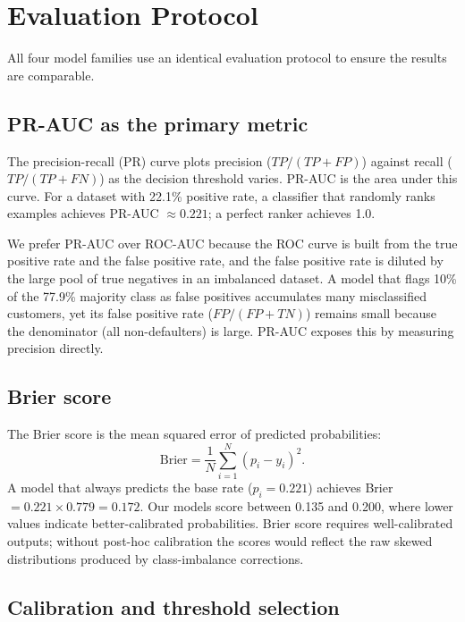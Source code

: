\documentclass[12pt,a4paper]{article}
\begin{document}
\section{Evaluation Protocol}
\label{sec:eval}

All four model families use an identical evaluation protocol to ensure the
results are comparable.

\subsection{PR-AUC as the primary metric}

The precision-recall (PR) curve plots precision
($TP / (TP + FP)$) against recall ($TP / (TP + FN)$) as the decision
threshold varies. PR-AUC is the area under this curve. For a dataset with
22.1\% positive rate, a classifier that randomly ranks examples achieves
PR-AUC $\approx 0.221$; a perfect ranker achieves 1.0.

We prefer PR-AUC over ROC-AUC because the ROC curve is built from the true
positive rate and the false positive rate, and the false positive rate is
diluted by the large pool of true negatives in an imbalanced dataset. A model
that flags 10\% of the 77.9\% majority class as false positives accumulates
many misclassified customers, yet its false positive rate ($FP / (FP+TN)$)
remains small because the denominator (all non-defaulters) is large. PR-AUC
exposes this by measuring precision directly.

\subsection{Brier score}

The Brier score is the mean squared error of predicted probabilities:
\[
  \text{Brier} = \frac{1}{N}\sum_{i=1}^N (p_i - y_i)^2.
\]
A model that always predicts the base rate ($p_i = 0.221$) achieves
Brier $= 0.221 \times 0.779 = 0.172$. Our models score between 0.135 and
0.200, where lower values indicate better-calibrated probabilities.
Brier score requires well-calibrated outputs; without post-hoc calibration
the scores would reflect the raw skewed distributions produced by
class-imbalance corrections.

\subsection{Calibration and threshold selection}
\end{document}
